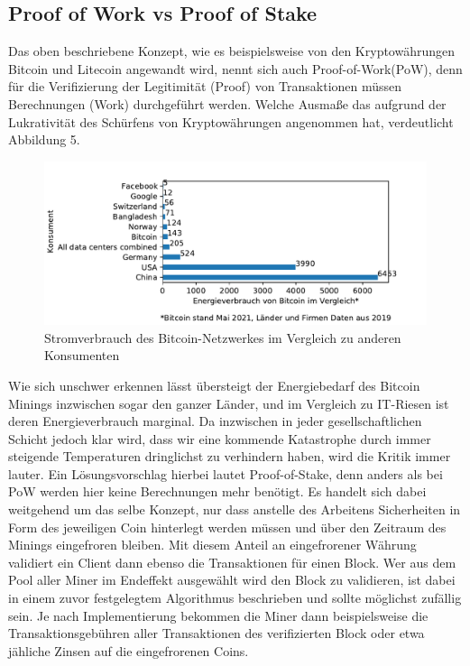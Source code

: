 \documentclass[12pt,oneside]{article}
\begin{document}
\subsection{Proof of Work vs Proof of Stake}
Das oben beschriebene Konzept, wie es beispielsweise von den Kryptowährungen Bitcoin und Litecoin angewandt wird, nennt sich auch \glqq Proof-of-Work\grqq (PoW), denn für die Verifizierung der Legitimität (Proof) von Transaktionen müssen Berechnungen (Work) durchgeführt werden. Welche Ausmaße das aufgrund der Lukrativität des Schürfens von Kryptowährungen angenommen hat, verdeutlicht Abbildung 5.
\begin{figure}[h]
\centering
\includegraphics[scale=0.7]{./images/energyconsume.pdf}
\caption{Stromverbrauch des Bitcoin-Netzwerkes im Vergleich zu anderen Konsumenten \cite{statista2021}}
\centering
\end{figure}

Wie sich unschwer erkennen lässt übersteigt der Energiebedarf des Bitcoin Minings inzwischen sogar den ganzer Länder, und im Vergleich zu IT-Riesen ist deren Energieverbrauch marginal. Da inzwischen in jeder gesellschaftlichen Schicht jedoch klar wird, dass wir eine kommende Katastrophe durch immer steigende Temperaturen dringlichst zu verhindern haben, wird die Kritik immer lauter. Ein Lösungsvorschlag hierbei lautet Proof-of-Stake, denn anders als bei PoW werden hier keine Berechnungen mehr benötigt. Es handelt sich dabei weitgehend um das selbe Konzept, nur dass anstelle des Arbeitens Sicherheiten in Form des jeweiligen Coin hinterlegt werden müssen und über den Zeitraum des Minings eingefroren bleiben. Mit diesem Anteil an eingefrorener Währung validiert ein Client dann ebenso die Transaktionen für einen Block. Wer aus dem Pool aller Miner im Endeffekt ausgewählt wird den Block zu validieren, ist dabei in einem zuvor festgelegtem Algorithmus beschrieben und sollte möglichst zufällig sein. Je nach Implementierung bekommen die Miner dann beispielsweise die Transaktionsgebühren aller Transaktionen des verifizierten Block oder etwa jähliche Zinsen auf die eingefrorenen Coins. \cite[p.115]{soeteman2019}
\end{document}
